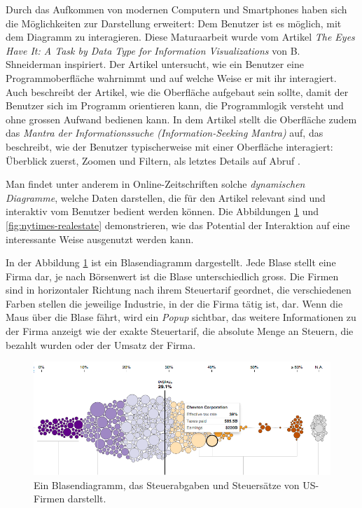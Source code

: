 Durch das Aufkommen von modernen Computern und Smartphones haben sich die Möglichkeiten zur Darstellung erweitert: Dem Benutzer ist es möglich, mit dem Diagramm zu interagieren. Diese Maturaarbeit wurde vom Artikel \textit{The Eyes Have It: A Task by Data Type for Information Visualizations} von B. Shneiderman \cite{shneiderman} inspiriert. Der Artikel untersucht, wie ein Benutzer eine Programmoberfläche wahrnimmt und auf welche Weise er mit ihr interagiert. Auch beschreibt der Artikel, wie die Oberfläche aufgebaut sein sollte, damit der Benutzer sich im Programm orientieren kann, die Programmlogik versteht und ohne grossen Aufwand bedienen kann. In dem Artikel stellt die Oberfläche zudem das \textit{Mantra der Informationssuche (Information-Seeking Mantra)} auf, das beschreibt, wie der Benutzer typischerweise mit einer Oberfläche interagiert: Überblick zuerst, Zoomen und Filtern, als letztes Details auf Abruf \cite{shneiderman}.

Man findet unter anderem in Online-Zeitschriften solche \textit{dynamischen Diagramme}, welche Daten darstellen, die für den Artikel relevant sind und interaktiv vom Benutzer bedient werden können. Die Abbildungen \ref{fig:nytimes-taxes} und \ref{fig:nytimes-realestate} demonstrieren, wie das Potential der Interaktion auf eine interessante Weise ausgenutzt werden kann.

In der Abbildung \ref{fig:nytimes-taxes} ist ein Blasendiagramm dargestellt. Jede Blase stellt eine Firma dar, je nach Börsenwert ist die Blase unterschiedlich gross. Die Firmen sind in horizontaler Richtung nach ihrem Steuertarif geordnet, die verschiedenen Farben stellen die jeweilige Industrie, in der die Firma tätig ist, dar. Wenn die Maus über die Blase fährt, wird ein \textit{Popup} sichtbar, das weitere Informationen zu der Firma anzeigt wie der exakte Steuertarif, die absolute Menge an Steuern, die bezahlt wurden oder der Umsatz der Firma.

\begin{figure}[!htbp]
	\centering
	\includegraphics[width=\linewidth]{images/nytimes-taxes-zugeschnitten}
	\caption[Blasendiagramm in The New York Times ()]{Ein Blasendiagramm, das Steuerabgaben und Steuersätze von US-Firmen darstellt. \cite{nytimes-taxes}}
	\label{fig:nytimes-taxes}
\end{figure}

